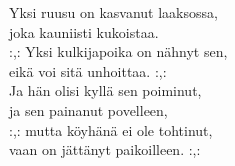 
        Yksi ruusu on kasvanut laaksossa, \\
        joka kauniisti kukoistaa. \\
        :,: Yksi kulkijapoika on nähnyt sen, \\
        eikä voi sitä unhoittaa. :,: \\
        Ja hän olisi kyllä sen poiminut, \\
        ja sen painanut povelleen, \\
        :,: mutta köyhänä ei ole tohtinut, \\
        vaan on jättänyt paikoilleen. :,: \\

